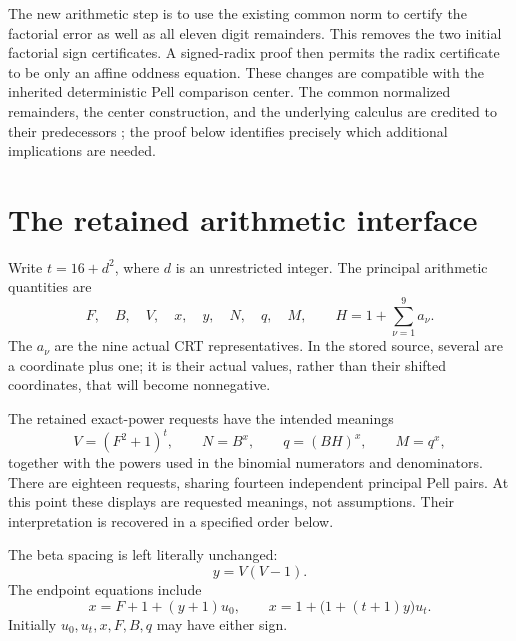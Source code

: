 \documentclass[11pt]{article}
\theoremstyle{definition}\newtheorem{definition}[theorem]{Definition}
\begin{document}
The new arithmetic step is to use the existing common norm to certify the
factorial error as well as all eleven digit remainders. This removes the
two initial factorial sign certificates. A signed-radix proof then permits
the radix certificate to be only an affine oddness equation. These changes
are compatible with the inherited deterministic Pell comparison center.
The common normalized remainders, the center construction, and the
underlying calculus are credited to their predecessors
\cite{common,symmetric,centered,repo}; the proof below identifies precisely
which additional implications are needed.

\section{The retained arithmetic interface}

Write \(t=16+d^2\), where \(d\) is an unrestricted integer. The principal
arithmetic quantities are
\[
 F,\quad B,\quad V,\quad x,\quad y,\quad N,\quad q,\quad
 M,\qquad H=1+\sum_{\nu=1}^{9}a_\nu.
\]
The \(a_\nu\) are the nine actual CRT representatives. In the stored source,
several are a coordinate plus one; it is their actual values, rather than
their shifted coordinates, that will become nonnegative.

The retained exact-power requests have the intended meanings
\begin{equation}\label{eq:power-meanings}
 V=(F^2+1)^t,\qquad N=B^x,\qquad q=(BH)^x,\qquad M=q^x,
\end{equation}
together with the powers used in the binomial numerators and denominators.
There are eighteen requests, sharing fourteen independent principal Pell
pairs. At this point these displays are requested meanings, not assumptions.
Their interpretation is recovered in a specified order below.

The beta spacing is left literally unchanged:
\begin{equation}\label{eq:beta}
 y=V(V-1).
\end{equation}
The endpoint equations include
\begin{equation}\label{eq:endpoints}
 x=F+1+(y+1)u_0,\qquad
 x=1+\bigl(1+(t+1)y\bigr)u_t.
\end{equation}
Initially \(u_0,u_t,x,F,B,q\) may have either sign.
\end{document}
